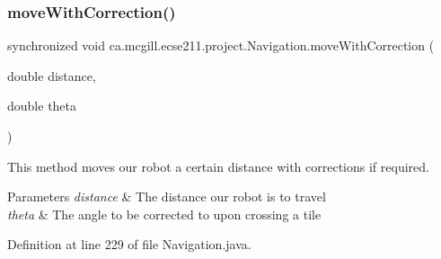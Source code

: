 \subsubsection{\texorpdfstring{move\+With\+Correction()}{moveWithCorrection()}}
{\footnotesize\ttfamily synchronized void ca.\+mcgill.\+ecse211.\+project.\+Navigation.\+move\+With\+Correction (\begin{DoxyParamCaption}\item[{double}]{distance,  }\item[{double}]{theta }\end{DoxyParamCaption})}

This method moves our robot a certain distance with corrections if required.


\begin{DoxyParams}{Parameters}
{\em distance} & The distance our robot is to travel \\
\hline
{\em theta} & The angle to be corrected to upon crossing a tile \\
\hline
\end{DoxyParams}


Definition at line 229 of file Navigation.\+java.


